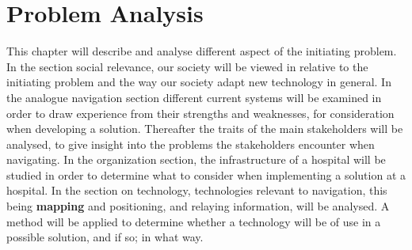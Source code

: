 \chapter{Problem Analysis} \label{cha:problem_analysis}
This chapter will describe and analyse different aspect of the initiating problem. In the section social relevance, our society will be viewed in relative to the initiating problem and the way our society adapt new technology in general. In the analogue navigation section different current systems will be examined in order to draw experience from their strengths and weaknesses, for consideration when developing a solution. Thereafter the traits of the main stakeholders will be analysed, to give insight into the problems the stakeholders encounter when navigating. In the organization section, the infrastructure of a hospital will be studied in order to determine what to consider when implementing a solution at a hospital. In the section on technology, technologies relevant to navigation, this being \textbf{mapping} and positioning, and relaying information, will be analysed. A method will be applied to determine whether a technology will be of use in a possible solution, and if so; in what way.













